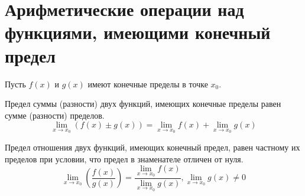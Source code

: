 \section{Арифметические операции над функциями, имеющими конечный предел}

Пусть $f(x)$ и  $g(x)$ имеют конечные пределы в точке $x_0$.

\begin{theorem}
  Предел суммы (разности) двух функций, имеющих конечные пределы равен сумме (разности) пределов.\[
  \lim_{x \to x_0} (f(x) \pm g(x)) = \lim_{x \to x_0} f(x) + \lim_{x \to x_0} g(x)
  \] 
\end{theorem}

\begin{theorem}
  Предел отношения двух функций, имеющих конечный предел, равен частному их пределов при условии, что предел в знаменателе отличен от нуля. \[
  \lim_{x \to x_0} \left(\frac{f(x)}{g(x)} \right) = \frac{\lim_{x \to x_0} f(x)}{\lim_{x \to x_0} g(x)}, \lim_{x \to x_0} g(x) \neq 0
  \] 
\end{theorem}

